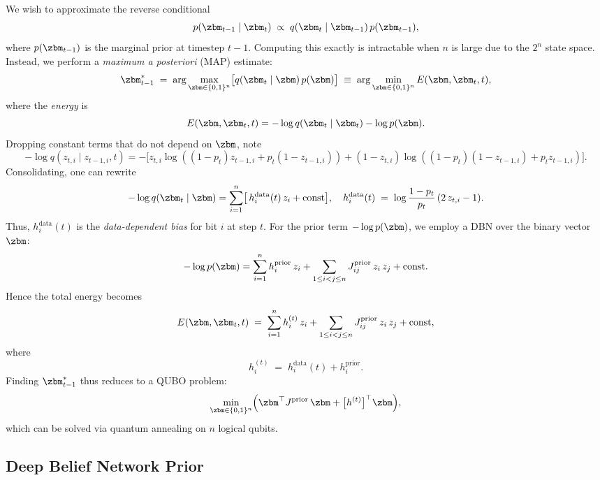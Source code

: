 \documentclass[11pt,letterpaper]{article}
\begin{document}
We wish to approximate the reverse conditional
\[
p(\zbm_{t-1} \mid \zbm_t) \;\propto\; q(\zbm_t\mid \zbm_{t-1})\,p(\zbm_{t-1}),
\]
where $p(\zbm_{t-1})$ is the marginal prior at timestep $t-1$. Computing this exactly is intractable when $n$ is large due to the $2^n$ state space. Instead, we perform a \emph{maximum a posteriori} (MAP) estimate:
\begin{equation}
\zbm_{t-1}^* \;=\; \arg\max_{\zbm \in \{0,1\}^n} \bigl[q(\zbm_t\mid \zbm)\,p(\zbm)\bigr]
\;\equiv\; \arg\min_{\zbm \in \{0,1\}^n} E(\zbm,\zbm_t,t),
\label{eq:map-denoise}
\end{equation}
where the \emph{energy} is
\begin{equation}
E(\zbm,\zbm_t,t)
= -\log q(\zbm_t \mid \zbm_{t})
- \log p(\zbm).
\label{eq:energy-def}
\end{equation}
Dropping constant terms that do not depend on $\zbm$, note
\[
-\log q(z_{t,i} \mid z_{t-1,i},t)
= -\bigl[z_{t,i}\log((1-p_t) z_{t-1,i} + p_t(1-z_{t-1,i}))
+ (1-z_{t,i})\log((1-p_t)(1-z_{t-1,i}) + p_t z_{t-1,i})\bigr].
\]
Consolidating, one can rewrite
\begin{equation}
-\log q(\zbm_t \mid \zbm)
= \sum_{i=1}^n \bigl[\,h_i^{\text{data}}(t)\,z_i + \mathrm{const}\bigr],
\quad h_i^{\text{data}}(t) \;=\; \log\frac{1-p_t}{p_t}\,(2\,z_{t,i} - 1).
\end{equation}
Thus, $h_i^{\text{data}}(t)$ is the \emph{data-dependent bias} for bit $i$ at step $t$. For the prior term $-\log p(\zbm)$, we employ a DBN over the binary vector $\zbm$:
\begin{equation}
-\log p(\zbm)
= \sum_{i=1}^n h_i^{\text{prior}}\,z_i 
+ \sum_{1 \le i < j \le n} J_{ij}^{\text{prior}}\,z_i\,z_j
+ \mathrm{const}.
\end{equation}
Hence the total energy becomes
\begin{equation}
E(\zbm,\zbm_t,t) \;=\; \sum_{i=1}^n h_i^{(t)}\,z_i 
+ \sum_{1 \le i < j \le n} J_{ij}^{\text{prior}}\,z_i\,z_j
+ \mathrm{const},
\label{eq:single-step-energy}
\end{equation}
where
\[
h_i^{(t)} \;=\; h_i^{\text{data}}(t) + h_i^{\text{prior}}.
\]
Finding $\zbm_{t-1}^*$ thus reduces to a QUBO problem:
\[
\min_{\zbm \in \{0,1\}^n} \Bigl(\zbm^\top J^{\text{prior}}\,\zbm + \bigl[h^{(t)}\bigr]^\top \zbm\Bigr),
\]
which can be solved via quantum annealing on $n$ logical qubits.

\subsection{Deep Belief Network Prior}
\label{subsec:dbn-prior}
\end{document}
